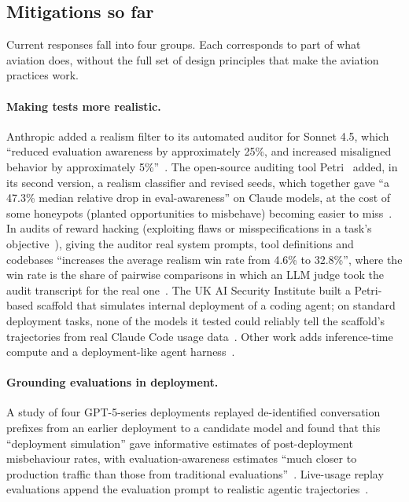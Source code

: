 \documentclass[11pt]{article}
\begin{document}
\subsection{Mitigations so far}\label{sec:mitigations}

Current responses fall into four groups. Each corresponds to part of what aviation does, without the full set of design principles that make the aviation practices work.

\paragraph{Making tests more realistic.} Anthropic added a realism filter to its automated auditor for Sonnet 4.5, which ``reduced evaluation awareness by approximately 25\%, and increased misaligned behavior by approximately 5\%''~\cite[Sec.~7.1.1]{anthropic2025sonnet45}. The open-source auditing tool Petri~\cite{anthropic2025petri} added, in its second version, a realism classifier and revised seeds, which together gave ``a 47.3\% median relative drop in eval-awareness'' on Claude models, at the cost of some honeypots (planted opportunities to misbehave) becoming easier to miss~\cite{anthropic2026petri2}. In audits of reward hacking (exploiting flaws or misspecifications in a task's objective~\cite{baker2025}), giving the auditor real system prompts, tool definitions and codebases ``increases the average realism win rate from 4.6\% to 32.8\%'', where the win rate is the share of pairwise comparisons in which an LLM judge took the audit transcript for the real one~\cite{kissane2026}. The UK AI Security Institute built a Petri-based scaffold that simulates internal deployment of a coding agent; on standard deployment tasks, none of the models it tested could reliably tell the scaffold's trajectories from real Claude Code usage data~\cite{souly2026}. Other work adds inference-time compute and a deployment-like agent harness~\cite{ahlqvist2026}.

\paragraph{Grounding evaluations in deployment.} A study of four GPT-5-series deployments replayed de-identified conversation prefixes from an earlier deployment to a candidate model and found that this ``deployment simulation'' gave informative estimates of post-deployment misbehaviour rates, with evaluation-awareness estimates ``much closer to production traffic than those from traditional evaluations''~\cite{williams2026}. Live-usage replay evaluations append the evaluation prompt to realistic agentic trajectories~\cite{ivanov2026}.
\end{document}
